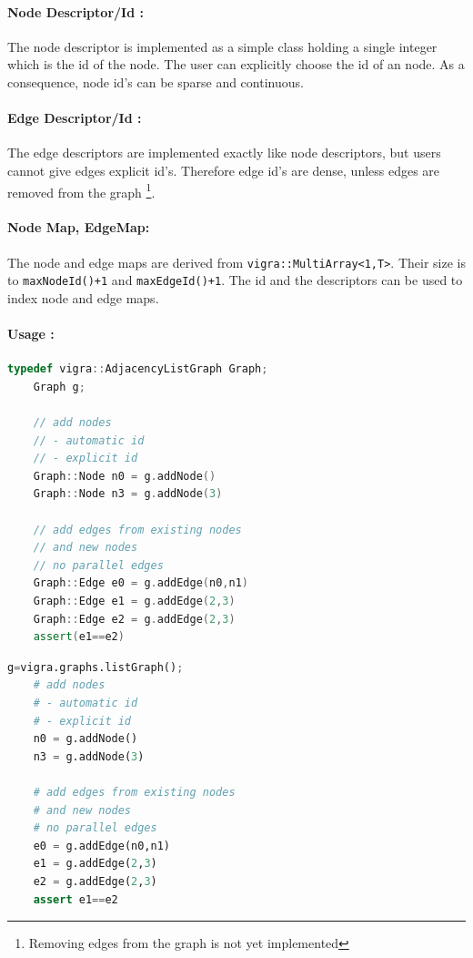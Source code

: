 \paragraph{Node Descriptor/Id :}
The node descriptor is implemented as a simple class
holding a single integer which is the id 
of the node.
The user can explicitly choose the id of
an node. As a consequence, node id's can 
be sparse and continuous.

\paragraph{Edge Descriptor/Id :}
The edge descriptors are implemented exactly like
node descriptors, but users cannot give
edges explicit id's.
Therefore edge id's are dense, unless
edges are removed from the graph \footnote{Removing edges from the graph is
not yet implemented}.

\paragraph{Node Map, EdgeMap:} 
The node and edge maps are derived from \lstinline{vigra::MultiArray<1,T>}.
Their size is to \lstinline{maxNodeId()+1} and  \lstinline{maxEdgeId()+1}.
The id and the descriptors can be used to index node and edge maps.


\paragraph{Usage :}
    \begin{lstlisting}[language=c++]
    typedef vigra::AdjacencyListGraph Graph;
    Graph g;

    // add nodes 
    // - automatic id
    // - explicit id
    Graph::Node n0 = g.addNode() 
    Graph::Node n3 = g.addNode(3)

    // add edges from existing nodes
    // and new nodes
    // no parallel edges 
    Graph::Edge e0 = g.addEdge(n0,n1)
    Graph::Edge e1 = g.addEdge(2,3)
    Graph::Edge e2 = g.addEdge(2,3)
    assert(e1==e2)  
    \end{lstlisting}

    \begin{lstlisting}[language=Python]
    g=vigra.graphs.listGraph();
    # add nodes 
    # - automatic id
    # - explicit id
    n0 = g.addNode() 
    n3 = g.addNode(3)

    # add edges from existing nodes
    # and new nodes
    # no parallel edges 
    e0 = g.addEdge(n0,n1)
    e1 = g.addEdge(2,3)
    e2 = g.addEdge(2,3)
    assert e1==e2  
    \end{lstlisting}
